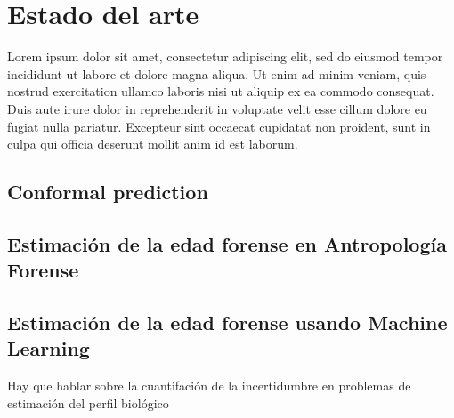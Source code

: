 \chapter{Estado del arte}

Lorem ipsum dolor sit amet, consectetur adipiscing elit, sed do eiusmod tempor incididunt ut labore et dolore magna 
aliqua. Ut enim ad minim veniam, quis nostrud exercitation ullamco laboris nisi ut aliquip ex ea commodo consequat. 
Duis aute irure dolor in reprehenderit in voluptate velit esse cillum dolore eu fugiat nulla pariatur. Excepteur 
sint occaecat cupidatat non proident, sunt in culpa qui officia deserunt mollit anim id est laborum. 


\section{Conformal prediction}




\section{Estimación de la edad forense en Antropología Forense}



\section{Estimación de la edad forense usando Machine Learning}

Hay que hablar sobre la cuantifación de la incertidumbre en problemas de estimación del perfil biológico



